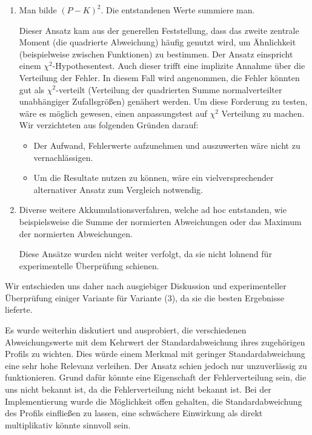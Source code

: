 \begin{enumerate}
\item Man bilde $(P-K)^2$. Die entstandenen Werte summiere man.
\par
Dieser Ansatz kam aus der generellen Feststellung, dass das zweite zentrale Moment (die quadrierte Abweichung) häufig genutzt wird, 
um Ähnlichkeit (beispielweise zwischen Funktionen) zu bestimmen.
Der Ansatz einspricht einem $\chi^2$-Hypothesentest. Auch dieser trifft eine implizite Annahme über die Verteilung der Fehler.
In diesem Fall wird angenommen, die Fehler könnten gut als $\chi^2$-verteilt (Verteilung der quadrierten Summe normalverteilter unabhängiger Zufallsgrößen) genähert werden.
Um diese Forderung zu testen, wäre es möglich gewesen, einen anpassungstest auf $\chi^2$ Verteilung zu machen.
Wir verzichteten aus folgenden Gründen darauf:
\begin{itemize}
\item
Der Aufwand, Fehlerwerte aufzunehmen und auszuwerten wäre nicht zu vernachlässigen.
\item Um die Resultate nutzen zu können, wäre ein vielversprechender alternativer Ansatz zum Vergleich notwendig.
\end{itemize}

\item Diverse weitere Akkumulationsverfahren, welche ad hoc entstanden, wie beispielsweise die Summe der normierten Abweichungen 
oder das Maximum der normierten Abweichungen.
\par
Diese Ansätze wurden nicht weiter verfolgt, da sie nicht lohnend für experimentelle Überprüfung schienen.
\end{enumerate}

Wir entschieden uns daher nach ausgiebiger Diskussion und experimenteller Überprüfung einiger Variante für Variante (3), da sie die besten Ergebnisse lieferte.
\par

Es wurde weiterhin diskutiert und ausprobiert, die verschiedenen Abweichungswerte mit dem Kehrwert der Standardabweichung ihres zugehörigen Profils zu wichten.
Dies würde einem Merkmal mit geringer Standardabweichung eine sehr hohe Relevanz verleihen.
Der Ansatz schien jedoch nur unzuverlässig zu funktionieren.
Grund dafür könnte eine Eigenschaft der Fehlerverteilung sein, die uns nicht bekannt ist, da die Fehlerverteilung nicht bekannt ist.
Bei der Implementierung wurde die Möglichkeit offen gehalten, die Standardabweichung des Profils einfließen zu lassen, 
eine schwächere Einwirkung als direkt multiplikativ könnte sinnvoll sein.

